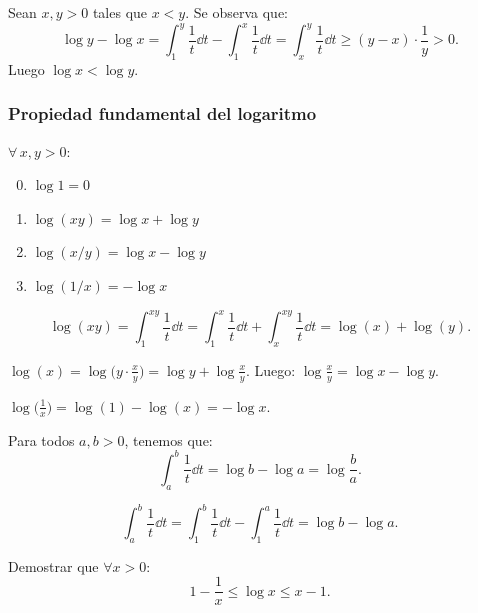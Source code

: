 \documentclass[11pt,a4paper]{article}
\begin{document}
\begin{demo}
Sean $x,y>0$ tales que $x<y$. Se observa que:
\[
  \log y-\log x=\int_1^y\frac1t\dd t-\int_1^x\frac1t\dd t=\int_x^y\frac1t\dd t\ge(y-x)\cdot\frac1y>0.
\]
Luego $\log x<\log y$.
\end{demo}

\subsubsection*{Propiedad fundamental del logaritmo}

$\forall\,x,y>0$:
\begin{enumerate}[label=(\arabic*)]
  \setcounter{enumi}{-1}
  \item $\log 1=0$
  \item $\log(xy)=\log x+\log y$
  \item $\log(x/y)=\log x-\log y$
  \item $\log(1/x)=-\log x$
\end{enumerate}

\begin{demo}[Demostración de (1)]
\[
  \log(xy)=\int_1^{xy}\frac1t\dd t=\int_1^x\frac1t\dd t+\int_x^{xy}\frac1t\dd t=\log(x)+\log(y).
\]
\end{demo}

\begin{demo}[Demostración de (2)]
$\log(x)=\log\bigl(y\cdot\frac{x}{y}\bigr)=\log y+\log\frac{x}{y}$. Luego: $\log\frac{x}{y}=\log x-\log y$.
\end{demo}

\begin{demo}[Demostración de (3)]
$\log\bigl(\frac1x\bigr)=\log(1)-\log(x)=-\log x$.
\end{demo}

\begin{proposicion}
Para todos $a,b>0$, tenemos que:
\[
  \int_a^b\frac1t\dd t=\log b-\log a=\log\frac{b}{a}.
\]
\end{proposicion}

\begin{demo}
\[
  \int_a^b\frac1t\dd t=\int_1^b\frac1t\dd t-\int_1^a\frac1t\dd t=\log b-\log a.
\]
\end{demo}

\begin{ejercicio}
Demostrar que $\forall x>0$:
\[
  1-\frac1x\le\log x\le x-1.
\]
\end{ejercicio}
\end{document}
